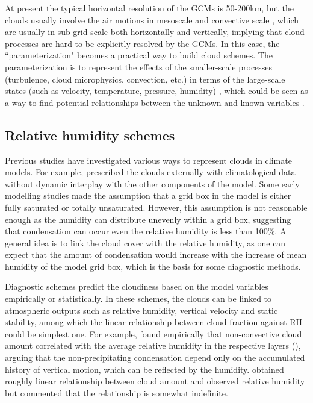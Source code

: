 At present the typical horizontal resolution of the GCMs is 50-200km, but the clouds usually involve the air motions in mesoscale and convective scale \citep{Houze2014}, which are usually in sub-grid scale both horizontally and vertically, implying that cloud processes are hard to be explicitly resolved by the GCMs. In this case, the ``parameterization" becomes a practical way to build cloud schemes. The parameterization is to represent the effects of the smaller-scale processes (turbulence, cloud microphysics, convection, etc.) in terms of the large-scale states (such as velocity, temperature, pressure, humidity) \citep{Randall2003}, which could be seen as a way to find potential relationships between the unknown and known variables \citep{Randall1989}.


\subsection{Relative humidity schemes}

Previous studies have investigated various ways to represent clouds in climate models. For example, \cite{Holloway1971} prescribed the clouds externally with climatological data without dynamic interplay with the other components of the model. Some early modelling studies made the assumption that a grid box in the model is either fully saturated or totally unsaturated. However, this assumption is not reasonable enough as the humidity can distribute unevenly within a grid box, suggesting that condensation can occur even the relative humidity is less than 100\%. A general idea is to link the cloud cover with the relative humidity, as one can expect that the amount of condensation would increase with the increase of mean humidity of the model grid box, which is the basis for some diagnostic methods.

Diagnostic schemes predict the cloudiness based on the model variables empirically or statistically. In these schemes, the clouds can be linked to atmospheric outputs such as relative humidity, vertical velocity and static stability, among which the linear relationship between cloud fraction against RH could be simplest one. For example, \cite{Smagorinsky1960} found empirically that non-convective cloud amount correlated with the average relative humidity in the respective layers (), arguing that the non-precipitating condensation depend only on the accumulated history of vertical motion, which can be reflected by the humidity. \cite{Ricketts1973} obtained roughly linear relationship between cloud amount and observed relative humidity but commented that the relationship is somewhat indefinite.

